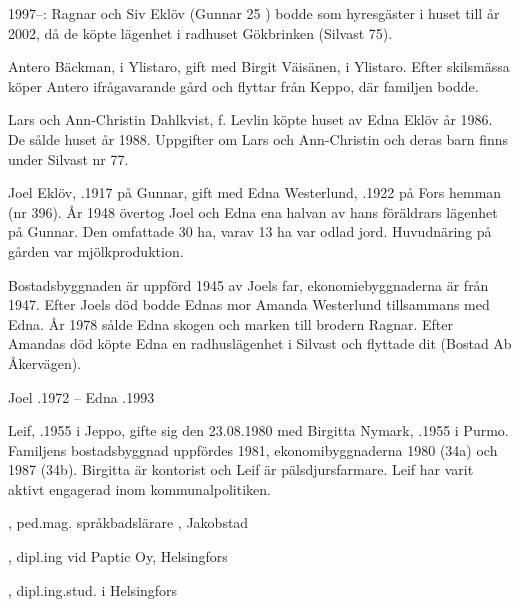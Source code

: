 1997--: Ragnar och Siv Eklöv (Gunnar 25 ) bodde som hyresgäster i huset till år 2002, då de köpte lägenhet i radhuset Gökbrinken (Silvast 75).


Antero Bäckman,  i Ylistaro, gift med Birgit Väisänen,  i Ylistaro. Efter skilsmässa köper Antero ifrågavarande gård och flyttar från Keppo, där familjen bodde.
\begin{jhchildren}
  \item {}
  \item {}
\end{jhchildren}


Lars och Ann-Christin Dahlkvist, f. Levlin  köpte huset av Edna Eklöv år 1986. De sålde huset år 1988. Uppgifter om Lars och Ann-Christin och deras barn finns under Silvast nr 77.


Joel Eklöv, .1917 på Gunnar, gift med Edna Westerlund, .1922 på Fors hemman (nr 396). År 1948 övertog Joel och Edna ena halvan av hans föräldrars lägenhet på Gunnar. Den omfattade 30 ha, varav 13 ha var odlad jord. Huvudnäring på gården var mjölkproduktion.

Bostadsbyggnaden är uppförd 1945 av Joels far, ekonomiebyggnaderna är från 1947. Efter Joels död bodde Ednas mor Amanda Westerlund tillsammans med Edna. År 1978 sålde Edna skogen och marken till brodern Ragnar. Efter Amandas död köpte Edna en radhuslägenhet i Silvast och flyttade dit (Bostad Ab Åkervägen).

Joel .1972  --  Edna .1993



Leif, .1955 i Jeppo, gifte sig den 23.08.1980 med Birgitta Nymark, .1955 i Purmo. Familjens bostadsbyggnad uppfördes 1981, ekonomibyggnaderna 1980 (34a) och 1987 (34b). Birgitta är kontorist och Leif är pälsdjursfarmare. Leif har varit aktivt engagerad inom kommunalpolitiken.
\begin{jhchildren}
  \item {}, ped.mag. språkbadslärare , Jakobstad
  \item {}, dipl.ing vid Paptic Oy, Helsingfors
  \item {}, dipl.ing.stud. i Helsingfors
\end{jhchildren}
